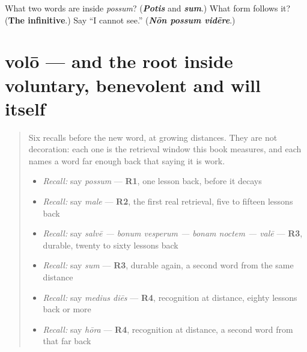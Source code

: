 \begin{tcolorbox}[breakable,colback=teal!4,colframe=teal!35!black,title={Before you move on}]
What two words are inside \emph{possum}? (\emph{\textbf{Potis}} and \emph{\textbf{sum}}.) What form follows it? (\textbf{The infinitive}.) Say \textquotedblleft{}I cannot see.\textquotedblright{} (\emph{\textbf{Nōn possum vidēre}}.)
\end{tcolorbox}
\section[volō, velle]{volō — and the root inside voluntary, benevolent and will itself}

\label{lesson:LA-C49-volo}



\begin{quote}
Six recalls before the new word, at growing distances. They are not decoration: each one is the retrieval window this book measures, and each names a word far enough back that saying it is work.

\begin{itemize}
\raggedright
  \item \emph{Recall:} say \emph{possum} — \textbf{R1}, one lesson back, before it decays
  \item \emph{Recall:} say \emph{male} — \textbf{R2}, the first real retrieval, five to fifteen lessons back
  \item \emph{Recall:} say \emph{salvē — bonum vesperum — bonam noctem — valē} — \textbf{R3}, durable, twenty to sixty lessons back
  \item \emph{Recall:} say \emph{sum} — \textbf{R3}, durable again, a second word from the same distance
  \item \emph{Recall:} say \emph{medius diēs} — \textbf{R4}, recognition at distance, eighty lessons back or more
  \item \emph{Recall:} say \emph{hōra} — \textbf{R4}, recognition at distance, a second word from that far back
\end{itemize}
\end{quote}


